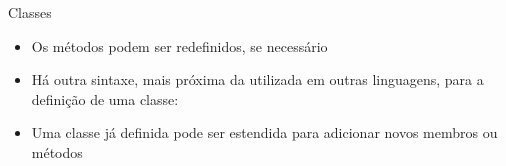 \begin{frame}[fragile]{Classes}

    \begin{itemize}
        \item Os métodos podem ser redefinidos, se necessário


        \item Há outra sintaxe, mais próxima da utilizada em outras linguagens, para a 
            definição de uma classe:


        \item Uma classe já definida pode ser estendida para adicionar novos membros ou métodos


    \end{itemize}

\end{frame}


